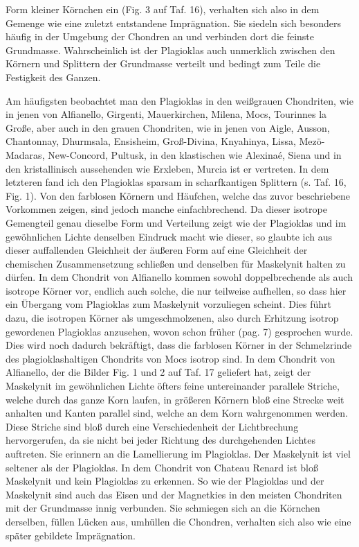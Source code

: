 \documentclass[a4paper, 12pt, oneside]{article}
\begin{document}
Form kleiner Körnchen ein (Fig. 3 auf Taf. 16), verhalten sich also in dem Gemenge wie eine zuletzt entstandene Imprägnation. Sie siedeln sich besonders häufig in der Umgebung der Chondren an und verbinden dort die feinste Grundmasse. Wahrscheinlich ist der Plagioklas auch unmerklich zwischen den Körnern und Splittern der Grundmasse verteilt und bedingt zum Teile die Festigkeit des Ganzen.

Am häufigsten beobachtet man den Plagioklas in den weißgrauen Chondriten, wie in jenen von Alfianello, Girgenti, Mauerkirchen, Milena, Mocs, Tourinnes la Große, aber auch in den grauen Chondriten, wie in jenen von Aigle, Ausson, Chantonnay, Dhurmsala, Ensisheim, Groß-Divina, Knyahinya, Lissa, Mezö-Madaras, New-Concord, Pultusk, in den klastischen wie Alexinaé, Siena und in den kristallinisch aussehenden wie Erxleben, Murcia ist er vertreten. In dem letzteren fand ich den Plagioklas sparsam in scharfkantigen Splittern (s. Taf. 16, Fig. 1). Von den farblosen Körnern und Häufchen, welche das zuvor beschriebene Vorkommen zeigen, sind jedoch manche einfachbrechend. Da dieser isotrope Gemengteil genau dieselbe Form und Verteilung zeigt wie der Plagioklas und im gewöhnlichen Lichte denselben Eindruck macht wie dieser, so glaubte ich aus dieser auffallenden Gleichheit der äußeren Form auf eine Gleichheit der chemischen Zusammensetzung schließen und denselben für Maskelynit halten zu dürfen. In dem Chondrit von Alfianello kommen sowohl doppelbrechende als auch isotrope Körner vor, endlich auch solche, die nur teilweise aufhellen, so dass hier ein Übergang vom Plagioklas zum Maskelynit vorzuliegen scheint. Dies führt dazu, die isotropen Körner als umgeschmolzenen, also durch Erhitzung isotrop gewordenen Plagioklas anzusehen, wovon schon früher (pag. 7) gesprochen wurde. Dies wird noch dadurch bekräftigt, dass die farblosen Körner in der Schmelzrinde des plagioklashaltigen Chondrits von Mocs isotrop sind. In dem Chondrit von Alfianello, der die Bilder Fig. 1 und 2 auf Taf. 17 geliefert hat, zeigt der Maskelynit im gewöhnlichen Lichte öfters feine untereinander parallele Striche, welche durch das ganze Korn laufen, in größeren Körnern bloß eine Strecke weit anhalten und Kanten parallel sind, welche an dem Korn wahrgenommen werden. Diese Striche sind bloß durch eine Verschiedenheit der Lichtbrechung hervorgerufen, da sie nicht bei jeder Richtung des durchgehenden Lichtes auftreten. Sie erinnern an die Lamellierung im Plagioklas. Der Maskelynit ist viel seltener als der Plagioklas. In dem Chondrit von Chateau Renard ist bloß Maskelynit und kein Plagioklas zu erkennen. So wie der Plagioklas und der Maskelynit sind auch das Eisen und der Magnetkies in den meisten Chondriten mit der Grundmasse innig verbunden. Sie schmiegen sich an die Körnchen derselben, füllen Lücken aus, umhüllen die Chondren, verhalten sich also wie eine später gebildete Imprägnation.
\end{document}
